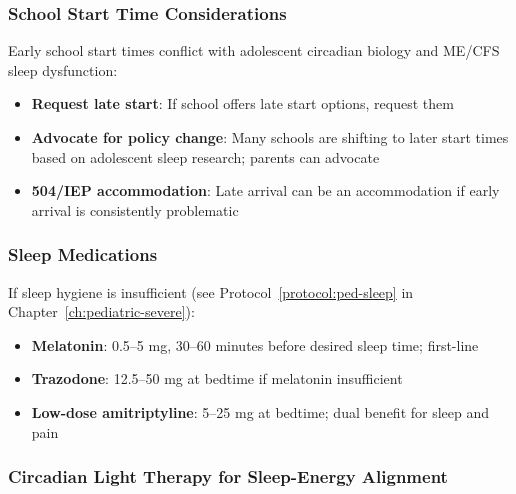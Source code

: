 \subsubsection{School Start Time Considerations}

Early school start times conflict with adolescent circadian biology and ME/CFS sleep dysfunction:

\begin{itemize}
    \item \textbf{Request late start}: If school offers late start options, request them
    \item \textbf{Advocate for policy change}: Many schools are shifting to later start times based on adolescent sleep research; parents can advocate
    \item \textbf{504/IEP accommodation}: Late arrival can be an accommodation if early arrival is consistently problematic
\end{itemize}

\subsubsection{Sleep Medications}

If sleep hygiene is insufficient (see Protocol~\ref{protocol:ped-sleep} in Chapter~\ref{ch:pediatric-severe}):

\begin{itemize}
    \item \textbf{Melatonin}: 0.5--5 mg, 30--60 minutes before desired sleep time; first-line
    \item \textbf{Trazodone}: 12.5--50 mg at bedtime if melatonin insufficient
    \item \textbf{Low-dose amitriptyline}: 5--25 mg at bedtime; dual benefit for sleep and pain
\end{itemize}

\subsubsection{Circadian Light Therapy for Sleep-Energy Alignment}

